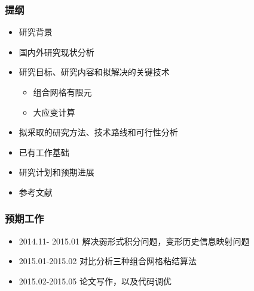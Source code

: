 \documentclass[mathserif]{beamer}
\begin{document}
\begin{CJK}{UTF8}{gkai}
	\begin{frame}
        \frametitle{提纲}
        \begin{itemize}
            \color{gray} 
            \item 研究背景
            \item 国内外研究现状分析
            \item 研究目标、研究内容和拟解决的关键技术
		  	\begin{itemize}
		    		\color{gray}
		  		\item 组合网格有限元
				\item 大应变计算
		  	\end{itemize}
            \item 拟采取的研究方法、技术路线和可行性分析
            \item 已有工作基础
	    \item  {\color{blue}研究计划和预期进展}
            \item 参考文献
        \end{itemize}
	\end{frame}

\begin{frame}
	\frametitle{预期工作}
	\begin{itemize}
		\item 2014.11- 2015.01 解决弱形式积分问题，变形历史信息映射问题
		\item 2015.01-2015.02 对比分析三种组合网格粘结算法
		\item 2015.02-2015.05 论文写作，以及代码调优
	\end{itemize}
\end{frame}


\end{CJK}
\end{document}
